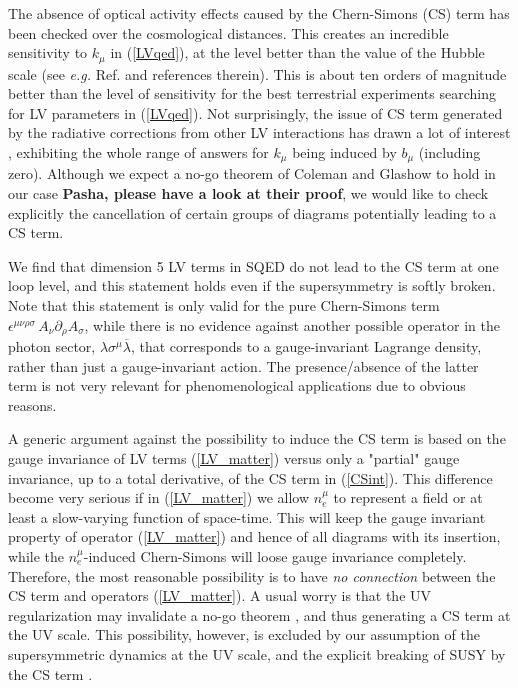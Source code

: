 \documentclass[12pt]{revtex4}
\begin{document}
    The absence of optical activity effects caused by the Chern-Simons (CS) term 
    has been checked over the cosmological distances. This creates an 
    incredible sensitivity to $k_\mu$ in (\ref{LVqed}), at the level better 
    than the value of the Hubble scale (see {\em e.g.} Ref. \cite{CFJ} and references therein). 
   This is about ten orders of magnitude 
    better than the level of sensitivity for the best terrestrial experiments searching for 
    LV parameters in (\ref{LVqed}). Not surprisingly, the issue of 
CS term generated by the radiative corrections from other LV interactions 
    has drawn a lot of interest \cite{CG,Jackiw:1999yp,Chung:1998jv,Andrianov:2001zj}, 
    exhibiting the whole range of answers for $k_\mu$ being induced by $b_\mu$ 
(including zero). Although we expect a no-go theorem of Coleman and Glashow \cite{CG}
to hold in our case {\bf Pasha, please have a look at their proof}, 
we would like to check explicitly the cancellation of certain groups of diagrams 
potentially leading to a CS term. 

We find that dimension 5 LV terms in SQED do not lead to the CS term at one loop level,
and this statement holds even if the supersymmetry is softly broken.
 Note that this statement is only valid for the pure Chern-Simons term
$ \epsilon^{\mu\nu\rho\sigma}\, A_\nu \partial_\rho A_\sigma $, 
while there is no evidence against another possible operator in the 
    photon sector,  $ \lambda \sigma^\mu \overline{\lambda} $,
    that corresponds to a gauge-invariant Lagrange density, rather than just a 
    gauge-invariant action. The presence/absence of the latter term is not very relevant for
phenomenological applications due to obvious reasons. 

A generic argument against the possibility to induce the CS term
    is based on the gauge invariance of  LV terms (\ref{LV_matter})
versus only  a "partial" gauge invariance, up to a total derivative, of the 
    CS term in (\ref{CSint}).
This difference become very serious if in (\ref{LV_matter})
we allow $ n_e^\mu $ to represent a field or at least a slow-varying function
of space-time.  This will keep the gauge invariant property of 
    operator (\ref{LV_matter}) and hence of all diagrams with its insertion,
while the $ n_e^\mu $-induced Chern-Simons will loose gauge invariance completely.
Therefore, the most reasonable possibility is to have {\em no connection} between 
the CS term and operators  (\ref{LV_matter}). A usual worry is that 
the UV regularization may invalidate a no-go theorem \cite{CG}, and thus generating 
    a CS term at the UV scale. This possibility, however, 
is excluded by our assumption of the supersymmetric dynamics at the UV scale, and the 
explicit breaking of SUSY by the CS term \cite{Belich:,GrootNibbelink:2004za}.
\end{document}
